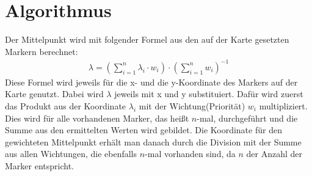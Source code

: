 \documentclass[a4paper, twoside, 12pt]{scrreprt}
\begin{document}
\chapter{Algorithmus}
Der Mittelpunkt wird mit folgender Formel aus den auf der Karte gesetzten Markern berechnet:
\begin{eqnarray}
\lambda = \left(\sum_{i=1}^{n}\lambda_i \cdot w_i \right) \cdot \left(\sum_{i=1}^{n} w_i \right)^{-1}
\end{eqnarray}
Diese Formel wird jeweils für die x- und die y-Koordinate des Markers auf der Karte genutzt.
Dabei wird $\lambda$ jeweils mit x und y substituiert.
Dafür wird zuerst das Produkt aus der Koordinate $\lambda_i$ mit der Wichtung(Priorität) $w_i$ multipliziert.
Dies wird für alle vorhandenen Marker, das heißt $n$-mal, durchgeführt und die Summe aus den ermittelten Werten wird gebildet.
Die Koordinate für den gewichteten Mittelpunkt erhält man danach durch die Division mit der Summe aus allen Wichtungen, die ebenfalls $n$-mal vorhanden sind, da $n$ der Anzahl der Marker entspricht.
\end{document}
